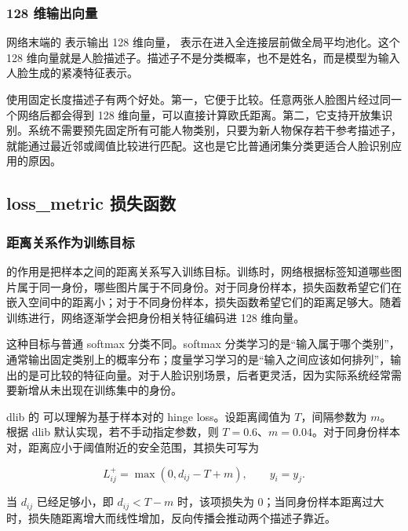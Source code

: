 \subsubsection{128 维输出向量}

网络末端的  表示输出 128 维向量， 表示在进入全连接层前做全局平均池化。这个 128 维向量就是人脸描述子。描述子不是分类概率，也不是姓名，而是模型为输入人脸生成的紧凑特征表示。

使用固定长度描述子有两个好处。第一，它便于比较。任意两张人脸图片经过同一个网络后都会得到 128 维向量，可以直接计算欧氏距离。第二，它支持开放集识别。系统不需要预先固定所有可能人物类别，只要为新人物保存若干参考描述子，就能通过最近邻或阈值比较进行匹配。这也是它比普通闭集分类更适合人脸识别应用的原因。

\subsection{loss\_metric 损失函数}

\subsubsection{距离关系作为训练目标}

 的作用是把样本之间的距离关系写入训练目标。训练时，网络根据标签知道哪些图片属于同一身份，哪些图片属于不同身份。对于同身份样本，损失函数希望它们在嵌入空间中的距离小；对于不同身份样本，损失函数希望它们的距离足够大。随着训练进行，网络逐渐学会把身份相关特征编码进 128 维向量。

这种目标与普通 softmax 分类不同。softmax 分类学习的是“输入属于哪个类别”，通常输出固定类别上的概率分布；度量学习学习的是“输入之间应该如何排列”，输出的是可比较的特征向量。对于人脸识别场景，后者更灵活，因为实际系统经常需要新增从未出现在训练集中的身份。

dlib 的  可以理解为基于样本对的 hinge loss。设距离阈值为 $T$，间隔参数为 $m$。根据 dlib 默认实现，若不手动指定参数，则 $T=0.6$、$m=0.04$。对于同身份样本对，距离应小于阈值附近的安全范围，其损失可写为

\begin{equation}
  L_{ij}^{+} = \max(0, d_{ij} - T + m), \qquad y_i = y_j.
  \label{eq:positive_loss}
\end{equation}

当 $d_{ij}$ 已经足够小，即 $d_{ij} < T-m$ 时，该项损失为 0；当同身份样本距离过大时，损失随距离增大而线性增加，反向传播会推动两个描述子靠近。

